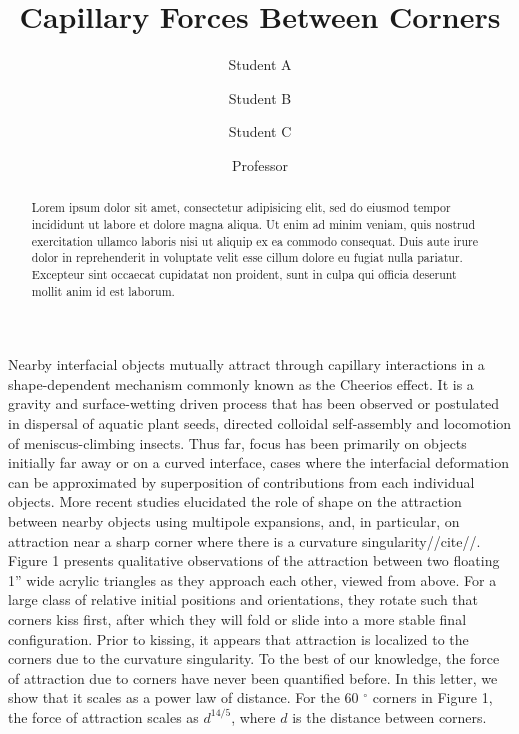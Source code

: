 \documentclass[twocolumn,prl]{revtex4-1}
\begin{document}
\title{Capillary Forces Between Corners}
\author{Student A}
\author{Student B}
\author{Student C}
\author{Professor}

\begin{abstract}
	Lorem ipsum dolor sit amet, consectetur adipisicing elit, sed do eiusmod tempor incididunt ut labore et dolore magna aliqua. Ut enim ad minim veniam, quis nostrud exercitation ullamco laboris nisi ut aliquip ex ea commodo consequat. Duis aute irure dolor in reprehenderit in voluptate velit esse cillum dolore eu fugiat nulla pariatur. Excepteur sint occaecat cupidatat non proident, sunt in culpa qui officia deserunt mollit anim id est laborum.
\end{abstract}

\maketitle

	Nearby interfacial objects mutually attract through capillary interactions in a shape-dependent mechanism commonly known as the Cheerios effect. It is a gravity and surface-wetting driven process that has been observed or postulated in dispersal of aquatic plant seeds\cite{peruzzo2013capillary}, directed colloidal self-assembly\cite{fan2004assembly} and locomotion of meniscus-climbing insects\cite{hu2005meniscus}. Thus far, focus has been primarily on objects initially far away or on a curved interface, cases where the interfacial deformation can be approximated by superposition of contributions from each individual objects. More recent studies elucidated the role of shape on the attraction between nearby objects using multipole expansions, and, in particular, on attraction near a sharp corner where there is a curvature singularity//cite//. Figure 1 presents qualitative observations of the attraction between two floating 1'' wide acrylic triangles as they approach each other, viewed from above. For a large class of relative initial positions and orientations, they rotate such that corners kiss first, after which they will fold or slide into a more stable final configuration. Prior to kissing, it appears that attraction is localized to the corners due to the curvature singularity. To the best of our knowledge, the force of attraction due to corners have never been quantified before. In this letter, we show that it scales as a power law of distance. For the 60 $^{\circ}$ corners in Figure 1, the force of attraction scales as $d^{14/5}$, where $d$ is the distance between corners.
\end{document}

